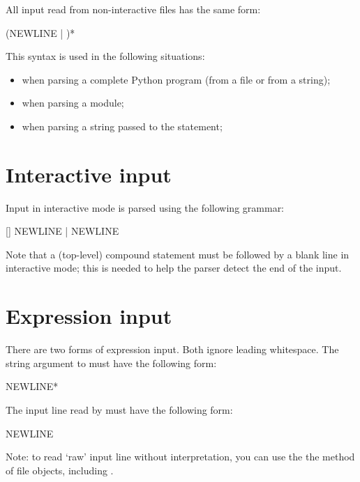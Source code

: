 All input read from non-interactive files has the same form:

\begin{productionlist}
             {(NEWLINE | )*}
\end{productionlist}

This syntax is used in the following situations:

\begin{itemize}

\item when parsing a complete Python program (from a file or from a string);

\item when parsing a module;

\item when parsing a string passed to the  statement;

\end{itemize}


\section{Interactive input\label{interactive}}

Input in interactive mode is parsed using the following grammar:

\begin{productionlist}
             {[] NEWLINE |  NEWLINE}
\end{productionlist}

Note that a (top-level) compound statement must be followed by a blank
line in interactive mode; this is needed to help the parser detect the
end of the input.


\section{Expression input\label{expression-input}}

There are two forms of expression input.  Both ignore leading
whitespace.
The string argument to  must have the following form:

\begin{productionlist}
             { NEWLINE*}
\end{productionlist}

The input line read by  must have the following form:

\begin{productionlist}
             { NEWLINE}
\end{productionlist}

Note: to read `raw' input line without interpretation, you can use the
the  method of file objects, including .
